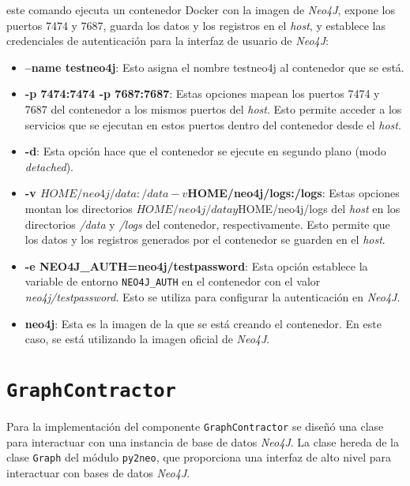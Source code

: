 este comando ejecuta un contenedor Docker con la imagen de \textit{Neo4J}, expone los puertos 7474 y 7687, guarda los datos y los registros en el \textit{host}, y establece las credenciales de autenticación para la interfaz de usuario de \textit{Neo4J}:

\begin{itemize}

    \item \textbf{--name testneo4j}: Esto asigna el nombre testneo4j al contenedor que se está.

   	\item \textbf{-p 7474:7474 -p 7687:7687}: Estas opciones mapean los puertos 7474 y 7687 del contenedor a los mismos puertos del \textit{host}. Esto permite acceder a los servicios que se ejecutan en estos puertos dentro del contenedor desde el \textit{host}.

    \item \textbf{-d}: Esta opción hace que el contenedor se ejecute en segundo plano (modo \textit{detached}).

    \item \textbf{-v $HOME/neo4j/data:/data -v $HOME/neo4j/logs:/logs}: Estas opciones montan los directorios $HOME/neo4j/data y $HOME/neo4j/logs del \textit{host} en los directorios \textit{/data} y \textit{/logs} del contenedor, respectivamente. Esto permite que los datos y los registros generados por el contenedor se guarden en el \textit{host}.

    \item \textbf{-e NEO4J\_AUTH=neo4j/testpassword}: Esta opción establece la variable de entorno \texttt{NEO4J\_AUTH} en el contenedor con el valor \textit{neo4j/testpassword}. Esto se utiliza para configurar la autenticación en \textit{Neo4J}.

    \item \textbf{neo4j}: Esta es la imagen de la que se está creando el contenedor. En este caso, se está utilizando la imagen oficial de \textit{Neo4J}.

\end{itemize}

\section{\texttt{GraphContractor}}

Para la implementación del componente \texttt{GraphContractor} se diseñó una clase para interactuar con una instancia de base de datos \textit{Neo4J}. La clase hereda de la clase \texttt{Graph} del módulo \texttt{py2neo}, que proporciona una interfaz de alto nivel para interactuar con bases de datos \textit{Neo4J}.

